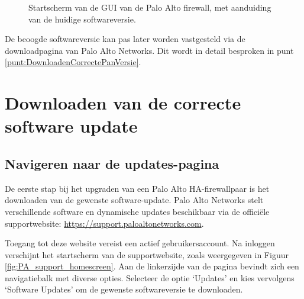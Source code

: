 \begin{figure}[H]
    \centering
    \caption[PA High Availability settings]{\label{fig:Huidige_PA_versie} Startscherm van de GUI van de Palo Alto firewall, met aanduiding van de huidige softwareversie.}
\end{figure}

De beoogde softwareversie kan pas later worden vastgesteld via de downloadpagina van Palo Alto Networks. Dit wordt in detail besproken in punt \ref{punt:DownloadenCorrectePanVersie}.

\section{Downloaden van de correcte software update}

\subsection{Navigeren naar de updates-pagina}
 
De eerste stap bij het upgraden van een Palo Alto HA-firewallpaar is het downloaden van de gewenste software-update. Palo Alto Networks stelt verschillende software en dynamische updates beschikbaar via de officiële supportwebsite: \url{https://support.paloaltonetworks.com}.  

Toegang tot deze website vereist een actief gebruikersaccount. Na inloggen verschijnt het startscherm van de supportwebsite, zoals weergegeven in Figuur \ref{fig:PA_support_homescreen}. Aan de linkerzijde van de pagina bevindt zich een navigatiebalk met diverse opties. Selecteer de optie ‘Updates’ en kies vervolgens ‘Software Updates’ om de gewenste softwareversie te downloaden.

